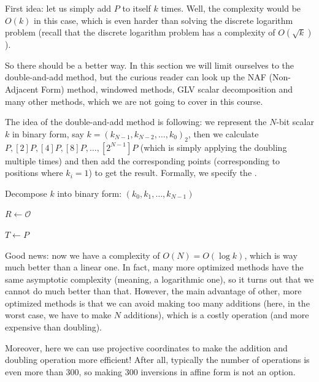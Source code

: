 \documentclass[../../book.tex]{subfiles}
\begin{document}
First idea: let us simply add $P$ to itself $k$ times. Well, the complexity would be $O(k)$ in this case, which is even harder than solving the discrete logarithm problem (recall that the discrete logarithm problem has a complexity of $O(\sqrt{k})$).

So there should be a better way. In this section we will limit ourselves to the double-and-add method, but the curious reader can look up the NAF (Non-Adjacent Form) method, windowed methods, GLV scalar decomposition and many other methods, which we are not going to cover in this course.

The idea of the double-and-add method is following: we represent the $N$-bit scalar $k$ in binary form, say $k = (k_{N-1},k_{N-2},\dots,k_0)_2$, then we calculate $P, [2]P, [4]P, [8]P, \dots, [2^{N-1}]P$ (which is simply applying the doubling multiple times) and then add the corresponding points (corresponding to positions where $k_i=1$) to get the result. Formally, we specify the .

\begin{algorithm}[H]
    \caption{Double-and-add method for scalar multiplication}\label{alg:double_and_add}
    
    Decompose $k$ into binary form: $(k_0,k_1,\dots,k_{N-1})$
    
    $R \gets \mathcal{O}$
    
    $T \gets P$
    
    
\end{algorithm}    

Good news: now we have a complexity of $O(N)=O(\log k)$, which is way much better than a linear one. In fact, many more optimized methods have the same asymptotic complexity (meaning, a logarithmic one), so it turns out that 
we cannot do much better than that. However, the main advantage of other, more optimized methods is that we can avoid making too many additions (here, in the worst case, we have to make $N$ additions), which is a costly operation (and more expensive than doubling).

Moreover, here we can use projective coordinates to make the addition and doubling operation more efficient! After all, typically the number of operations is even more than $300$, so making $300$ inversions in affine form is not an option.
\end{document}
